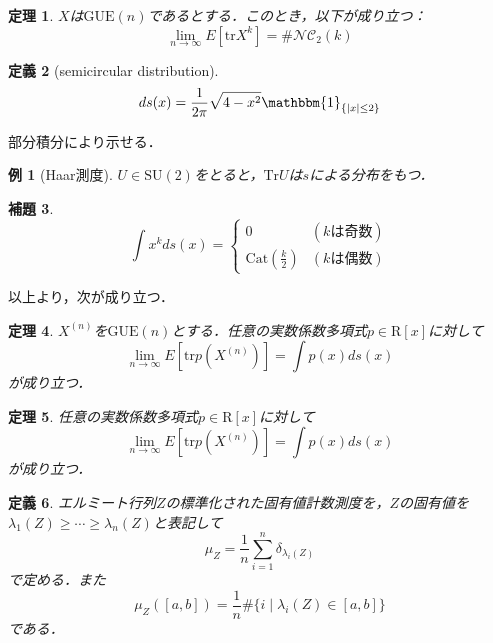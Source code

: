 \documentclass{ltjsarticle}
\makeatletter
\theoremstyle{mystyle1}
\newtheorem{dfn}{定義}[section]
\newtheorem{thm}[dfn]{定理}
\newtheorem{lem}[dfn]{補題}
\theoremstyle{mystyle2}
\newtheorem{example}{例}
\theoremstyle{mystyle3}
\renewenvironment{proof}[1][\proofname]{\par
  \pushQED{\qed}%
  \normalfont
  \topsep6\p@\@plus6\p@ \trivlist
  \item[\hskip\labelsep{\bfseries\sffamily #1}]\ignorespaces
}{%
  \popQED\endtrivlist\@endpefalse
}
\renewcommand\proofname{証明}
\makeatother
\begin{document}
\begin{thm}
    $X$は$\mathrm{GUE}(n)$であるとする．このとき，以下が成り立つ：
    \begin{equation}
        \lim_{n\to\infty}E[\mathrm{tr} X^k]=\#\mathcal{NC}_2(k)
    \end{equation}
\end{thm}

\begin{dfn}[semicircular distribution]
    \begin{equation}
        ds(x)=\frac{1}{2\pi}\sqrt{4-x^2}\mathbbm{1}_{\{|x|\leq2\}}
    \end{equation}
\end{dfn}

\begin{proof}
    部分積分により示せる．
\end{proof}

\begin{example}[Haar測度]
    $U\in\mathrm{SU}(2)$をとると，$\mathrm{Tr}U$は$s$による分布をもつ．
\end{example}

\begin{lem}
    \begin{equation}
        \int x^k ds(x)=\begin{cases}
            0                         & (kは奇数) \\
            \mathrm{Cat}(\frac{k}{2}) & (kは偶数)
        \end{cases}
    \end{equation}
\end{lem}

以上より，次が成り立つ．

\begin{thm}
    $X^{(n)}$を$\mathrm{GUE}(n)$とする．任意の実数係数多項式$p\in\mathrm{R}[x]$に対して
    \begin{equation}
        \lim_{n\to\infty}E[\mathrm{tr}p(X^{(n)})]=\int p(x)ds(x)
    \end{equation}
    が成り立つ．
\end{thm}

\begin{thm}
    任意の実数係数多項式$p\in\mathrm{R}[x]$に対して
    \begin{equation}
        \lim_{n\to\infty}E[\mathrm{tr}p(X^{(n)})]=\int p(x)ds(x)
    \end{equation}
    が成り立つ．
\end{thm}


\begin{dfn}
    エルミート行列$Z$の標準化された固有値計数測度を，$Z$の固有値を$\lambda_1(Z)\geq\cdots\geq\lambda_n(Z)$と表記して
    \begin{equation}
        \mu_Z=\frac{1}{n}\sum_{i=1}^n\delta_{\lambda_i(Z)}
    \end{equation}
    で定める．また
    \begin{equation}
        \mu_Z([a,b])=\frac{1}{n}\#\{i\mid\lambda_i(Z)\in[a,b]\}
    \end{equation}
    である．
\end{dfn}
\end{document}
